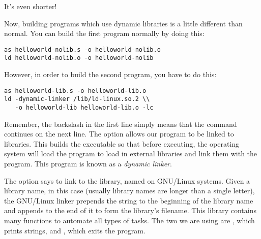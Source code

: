\begin{simpletyping}

\end{simpletyping}

It's even shorter!

Now, building programs which use dynamic libraries is a little
different than normal.  You can build the first program normally
by doing this:

\begin{simpletyping}
\begin{lstlisting}
as helloworld-nolib.s -o helloworld-nolib.o
ld helloworld-nolib.o -o helloworld-nolib
\end{lstlisting}
\end{simpletyping}

However, in order to build the second program, you have to do this:

\begin{simpletyping}
\begin{lstlisting}
as helloworld-lib.s -o helloworld-lib.o
ld -dynamic-linker /lib/ld-linux.so.2 \\
   -o helloworld-lib helloworld-lib.o -lc
\end{lstlisting}
\end{simpletyping}

Remember, the backslash in the first line simply means that the command continues on the next line.  The option
 allows our
program to be linked to libraries.  This builds the executable so that
before executing, the operating system will load the program 
 to load in external libraries
and link them with the program.  This program is known as a 
\emph{dynamic linker}.

The  option
says to link to the  library, named 
 on GNU/Linux systems.  Given a library
name,  in this case (usually library names are
longer than a single letter), the GNU/Linux linker prepends
the string  to the beginning of the library name and 
appends  to the end of it to form the library's
filename.  This library contains many functions to automate
all types of tasks.  The two we are using are
, which prints strings, and 
, which exits the program.  

